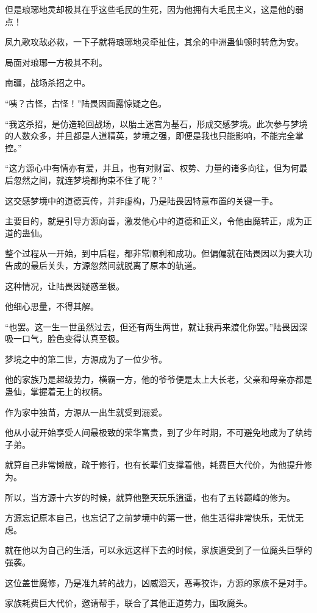 \begin{this_body}
但是琅琊地灵却极其在乎这些毛民的生死，因为他拥有大毛民主义，这是他的弱点！

凤九歌攻敌必救，一下子就将琅琊地灵牵扯住，其余的中洲蛊仙顿时转危为安。

局面对琅琊一方极其不利。

南疆，战场杀招之中。

“咦？古怪，古怪！”陆畏因面露惊疑之色。

“我这杀招，是仿造轮回战场，以胎土迷宫为基石，形成交感梦境。此次参与梦境的人数众多，并且都是人道精英，梦境之强，即便是我也只能影响，不能完全掌控。”

“这方源心中有情亦有爱，并且，也有对财富、权势、力量的诸多向往，但为何最后忽然之间，就连梦境都拘束不住了呢？”

这交感梦境中的道德真传，并非虚构，乃是陆畏因特意布置的关键一手。

主要目的，就是引导方源向善，激发他心中的道德和正义，令他由魔转正，成为正道的蛊仙。

整个过程从一开始，到中后程，都非常顺利和成功。但偏偏就在陆畏因以为要大功告成的最后关头，方源忽然间就脱离了原本的轨道。

这种情况，让陆畏因疑惑至极。

他细心思量，不得其解。

“也罢。这一生一世虽然过去，但还有两生两世，就让我再来渡化你罢。”陆畏因深吸一口气，脸色变得认真至极。

梦境之中的第二世，方源成为了一位少爷。

他的家族乃是超级势力，横霸一方，他的爷爷便是太上大长老，父亲和母亲亦都是蛊仙，掌握着无上的权柄。

作为家中独苗，方源从一出生就受到溺爱。

他从小就开始享受人间最极致的荣华富贵，到了少年时期，不可避免地成为了纨绔子弟。

就算自己非常懒散，疏于修行，也有长辈们支撑着他，耗费巨大代价，为他提升修为。

所以，当方源十六岁的时候，就算他整天玩乐逍遥，也有了五转巅峰的修为。

方源忘记原本自己，也忘记了之前梦境中的第一世，他生活得非常快乐，无忧无虑。

就在他以为自己的生活，可以永远这样下去的时候，家族遭受到了一位魔头巨擘的强袭。

这位盖世魔修，乃是准九转的战力，凶威滔天，恶毒狡诈，方源的家族不是对手。

家族耗费巨大代价，邀请帮手，联合了其他正道势力，围攻魔头。


\end{this_body}
